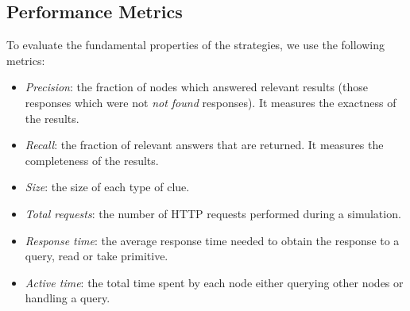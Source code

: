 \subsection{Performance Metrics}
To evaluate the fundamental properties of the strategies, we use the following metrics:
\begin{itemize}
  \item \textit{Precision}: the fraction of nodes which answered relevant results (those responses which were not
\textit{not found} responses). It measures the exactness of the results.
  \item \textit{Recall}: the fraction of relevant answers that are returned. It measures the completeness of the results.%
  \item \textit{Size}: the size of each type of clue.
  \item \textit{Total requests}: the number of HTTP requests performed during a simulation.
  \item \textit{Response time}: the average response time needed to obtain the response to a query, read or take
primitive.
  \item \textit{Active time}: the total time spent by each node either querying other nodes or handling a query.
\end{itemize}
